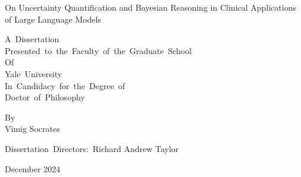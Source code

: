 \begin{titlepage}
	\begin{center}
		
		On Uncertainty Quantification and Bayesian Reasoning in Clinical Applications of Large Language Models
		\par\vfill
		A~Dissertation\\
		Presented~to~the~Faculty~of~the~Graduate~School\\
		Of\\
		Yale~University\\
		In~Candidacy~for~the~Degree~of\\
		Doctor~of~Philosophy
		\par\vfill
		By\\
		Vimig Socrates
		\par\vspace{1.5em}
		Dissertation~Directors:~Richard Andrew Taylor
		\par\vspace{1.5em}
		December 2024
		\vspace*{1cm}
		
%		
%		
%		
%		
%		
%		
%		
		
	\end{center}
\end{titlepage}